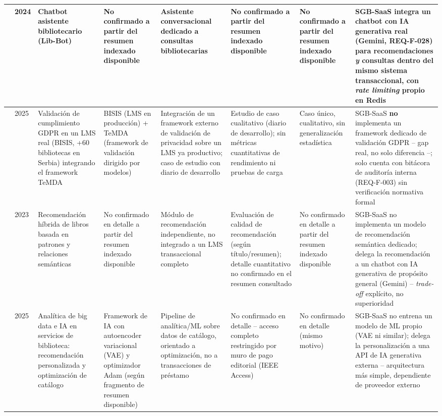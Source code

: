 \begin{landscape}
\begin{center}
\begin{longtable}{|p{2.0cm}|p{0.8cm}|p{2.5cm}|p{2.5cm}|p{2.8cm}|p{3.0cm}|p{2.8cm}|p{3.0cm}|}
\citet{ng2024libbot} & 2024 &
Chatbot asistente bibliotecario (Lib-Bot) &
No confirmado a partir del resumen indexado disponible &
Asistente conversacional dedicado a consultas bibliotecarias &
No confirmado a partir del resumen indexado disponible &
No confirmado a partir del resumen indexado disponible &
SGB-SaaS integra un chatbot con IA generativa real (Gemini,
REQ-F-028) para recomendaciones \emph{y} consultas dentro del mismo
sistema transaccional, con \emph{rate limiting} propio en Redis \\
\hline

\citet{rajacic2025gdpr} & 2025 &
Validación de cumplimiento GDPR en un LMS real (BISIS, +60 bibliotecas
en Serbia) integrando el framework TeMDA &
BISIS (LMS en producción) + TeMDA (framework de validación dirigido por
modelos) &
Integración de un framework externo de validación de privacidad sobre
un LMS ya productivo; caso de estudio con diario de desarrollo &
Estudio de caso cualitativo (diario de desarrollo); sin métricas
cuantitativas de rendimiento ni pruebas de carga &
Caso único, cualitativo, sin generalización estadística &
SGB-SaaS \textbf{no} implementa un framework dedicado de validación
GDPR -- gap real, no solo diferencia --; solo cuenta con bitácora de
auditoría interna (REQ-F-003) sin verificación normativa formal \\
\hline

\citet{wayesa2023recsys} & 2023 &
Recomendación híbrida de libros basada en patrones y relaciones
semánticas &
No confirmado en detalle a partir del resumen indexado disponible &
Módulo de recomendación independiente, no integrado a un LMS
transaccional completo &
Evaluación de calidad de recomendación (según título/resumen); detalle
cuantitativo no confirmado en el resumen consultado &
No confirmado en detalle a partir del resumen indexado disponible &
SGB-SaaS no implementa un modelo de recomendación semántica dedicado;
delega la recomendación a un chatbot con IA generativa de propósito
general (Gemini) -- \emph{trade-off} explícito, no superioridad \\
\hline

\citet{hu2025bigdata} & 2025 &
Analítica de big data e IA en servicios de biblioteca: recomendación
personalizada y optimización de catálogo &
Framework de IA con autoencoder variacional (VAE) y optimizador Adam
(según fragmento de resumen disponible) &
Pipeline de analítica/ML sobre datos de catálogo, orientado a
optimización, no a transacciones de préstamo &
No confirmado en detalle -- acceso completo restringido por muro de
pago editorial (IEEE Access) &
No confirmado en detalle (mismo motivo) &
SGB-SaaS no entrena un modelo de ML propio (VAE ni similar); delega la
personalización a una API de IA generativa externa -- arquitectura más
simple, dependiente de proveedor externo \\
\hline


\end{longtable}
\end{center}
\end{landscape}
